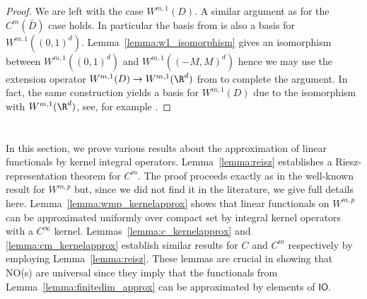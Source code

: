 \begin{proof}
We are left with the case \(W^{m,1}(D)\). A similar argument as for the \(C^m(\bar{D})\) case holds. In
particular the basis from \cite[Theorem 5]{ciesielski1972construction} is also a basis for \(W^{m,1}((0,1)^d)\).
Lemma~\ref{lemma:w1_isomorphism} gives an isomorphism between \(W^{m,1}((0,1)^d)\) and \(W^{m,1}((-M,M)^d)\) hence 
we may use the extension operator \(W^{m,1} (D) \to W^{m,1} (\R^d)\) from \cite[Chapter 6, Theorem 5]{stein1970singular}
to complete the argument. In fact, the same construction yields a basis for \(W^{m,1} (D)\) due 
to the isomorphism with \(W^{m,1} (\R^d)\), see, for example \cite[Theorem 1]{pelczynski2001contribution}.
\end{proof}



\section{}
\label{sec:appendix_functionalapprox}

In this section, we prove various results about the approximation of linear functionals by kernel integral operators. Lemma~\ref{lemma:reisz} establishes a Riesz-representation theorem for \(C^m\). The proof proceeds exactly as in the well-known result for \(W^{m,p}\) but, since we did not find it in the literature, we give full details here. Lemma~\ref{lemma:wmp_kernelapprox} shows that linear functionals on \(W^{m,p}\) can be approximated uniformly over compact set by integral kernel operators with a \(C^\infty\) kernel. Lemmas~\ref{lemma:c_kernelapprox} and \ref{lemma:cm_kernelapprox} establish similar results for \(C\) and \(C^m\) respectively by employing Lemma~\ref{lemma:reisz}. These lemmas are crucial in showing that NO(s) are universal since they imply that the functionals from Lemma~\ref{lemma:finitedim_approx} can be approximated by elements of \(\mathsf{IO}\).

